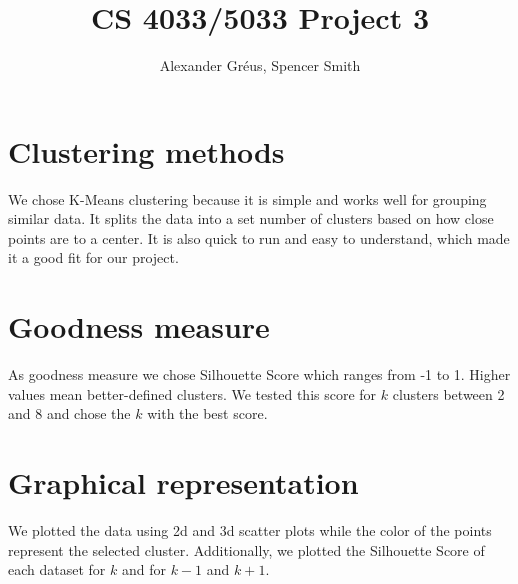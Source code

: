 \documentclass{article}
\title{CS 4033/5033 Project 3}
\author{Alexander Gréus, Spencer Smith}
\date{}
\begin{document}
\maketitle

\section{Clustering methods}

We chose K-Means clustering because it is simple and works well for grouping similar data. It splits the data into a set number of clusters based on how close points are to a center. It is also quick to run and easy to understand, which made it a good fit for our project.

\section{Goodness measure}

As goodness measure we chose Silhouette Score which ranges from -1 to 1. Higher values mean better-defined clusters. We tested this score for $k$ clusters between 2 and 8 and chose the $k$ with the best score.

\section{Graphical representation}

We plotted the data using 2d and 3d scatter plots while the color of the points represent the selected cluster. Additionally, we plotted the Silhouette Score of each dataset for $k$ and for $k-1$ and $k+1$.



\end{document}

